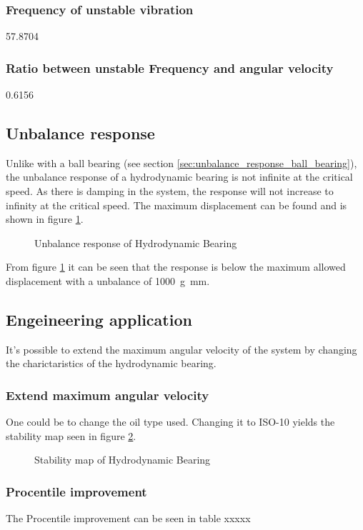 \subsubsection{Frequency of unstable vibration}
57.8704

\subsubsection{Ratio between unstable Frequency and angular velocity}
0.6156

\subsection{Unbalance response}
Unlike with a ball bearing (see section \ref{sec:unbalance_response_ball_bearing}), the unbalance response of a hydrodynamic bearing is not infinite at the critical speed.
As there is damping in the system, the response will not increase to infinity at the critical speed. The maximum displacement can be found and is shown in figure \ref{fig:hydrodynamic_bearing_unbalance_response}.
\begin{figure}[htbp]
    \centering
    
    \caption{Unbalance response of Hydrodynamic Bearing}
    \label{fig:hydrodynamic_bearing_unbalance_response}
\end{figure}

From figure \ref{fig:hydrodynamic_bearing_unbalance_response} it can be seen that the response is below the maximum allowed displacement with a unbalance of \SI{1000}{\gram \milli \meter}.

\subsection{Engeineering application}
It's possible to extend the maximum angular velocity of the system by changing the charictaristics of the hydrodynamic bearing.

\subsubsection{Extend maximum angular velocity}
One could be to change the oil type used. Changing it to ISO-10 yields the stability map seen in figure \ref{fig:hydrodynamic_bearing_stability_map}.
\begin{figure}[htbp]
    \centering
    
    \caption{Stability map of Hydrodynamic Bearing}
    \label{fig:hydrodynamic_bearing_stability_map}
\end{figure}

\subsubsection{Procentile improvement}
The Procentile improvement can be seen in table xxxxx